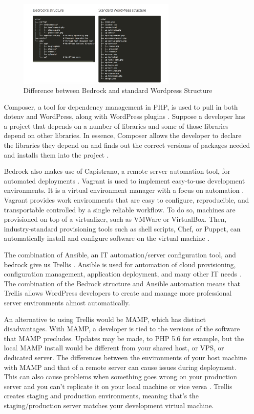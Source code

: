 \documentclass[fontsize=10pt]{extarticle}
\numberwithin{figure}{section} %
\begin{document}
\begin{figure}[H]
      \centering
      \includegraphics[trim = 0 0 0 0, clip, width=0.7\textwidth]{ph20.png}
      \caption{Difference between Bedrock and standard Wordpress Structure}
 \end{figure}

Composer, a tool for dependency management in PHP, is used to pull in
both dotenv and WordPress, along with WordPress plugins \cite{p7} .
Suppose a developer has a project that depends on a number of libraries
and some of those libraries depend on other libraries. In essence,
Composer allows the developer to declare the libraries they depend on
and finds out the correct versions of packages needed and installs them
into the project \cite{p8} .

Bedrock also makes use of Capistrano, a remote server automation tool,
for automated deployments \cite{p9}. Vagrant is used to implement
easy-to-use development environments. It is a virtual environment
manager with a focus on automation \cite{p10} . Vagrant provides work
environments that are easy to configure, reproducible, and transportable
controlled by a single reliable workflow. To do so, machines are
provisioned on top of a virtualizer, such as VMWare or VirtualBox. Then,
industry-standard provisioning tools such as shell scripts, Chef, or
Puppet, can automatically install and configure software on the virtual
machine \cite{p10} .

The combination of Ansible, an IT automation/server configuration tool,
and bedrock give us Trellis \cite{p11}. Ansible is used for automation
of cloud provisioning, configuration management, application deployment,
and many other IT needs \cite{p12}. The combination of the Bedrock
structure and Ansible automation means that Trellis allows WordPress
developers to create and manage more professional server environments
almost automatically.

An alternative to using Trellis would be MAMP, which has distinct
disadvantages. With MAMP, a developer is tied to the versions of the
software that MAMP precludes. Updates may be made, to PHP 5.6 for
example, but the local MAMP install would be different from your shared
host, or VPS, or dedicated server. The differences between the
environments of your host machine with MAMP and that of a remote server
can cause issues during deployment. This can also cause problems when
something goes wrong on your production server and you can't replicate
it on your local machine or vice versa \cite{p13} . Trellis creates
staging and production environments, meaning that's the
staging/production server matches your development virtual machine.
\end{document}
